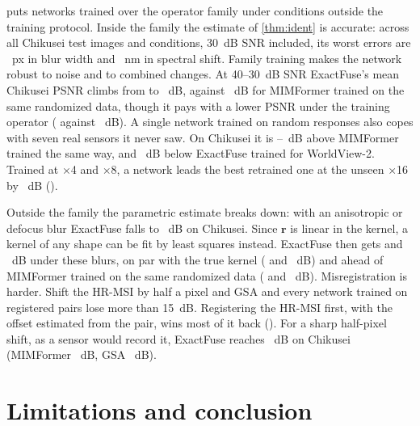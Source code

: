 \documentclass[10pt,twocolumn,letterpaper]{article}
\begin{document}
 puts networks trained over the operator family under conditions outside the training protocol. Inside the family the estimate of \cref{thm:ident} is accurate: across all Chikusei test images and conditions, 30~dB SNR included, its worst errors are ~px in blur width and ~nm in spectral shift. Family training makes the network robust to noise and to combined changes. At 40--30~dB SNR ExactFuse's mean Chikusei PSNR climbs from  to ~dB, against ~dB for MIMFormer trained on the same randomized data, though it pays with a lower PSNR under the training operator ( against ~dB). A single network trained on random responses also copes with seven real sensors it never saw. On Chikusei it is --~dB above MIMFormer trained the same way, and ~dB below ExactFuse trained for WorldView-2. Trained at $\times$4 and $\times$8, a network leads the best retrained one at the unseen $\times$16 by ~dB (\supp).

Outside the family the parametric estimate breaks down: with an anisotropic or defocus blur ExactFuse falls to ~dB on Chikusei. Since $\mathbf{r}$ is linear in the kernel, a kernel of any shape can be fit by least squares instead. ExactFuse then gets  and ~dB under these blurs, on par with the true kernel ( and ~dB) and ahead of MIMFormer trained on the same randomized data ( and ~dB). Misregistration is harder. Shift the HR-MSI by half a pixel and GSA and every network trained on registered pairs lose more than 15~dB. Registering the HR-MSI first, with the offset estimated from the pair, wins most of it back (\supp). For a sharp half-pixel shift, as a sensor would record it, ExactFuse reaches ~dB on Chikusei (MIMFormer ~dB, GSA ~dB).

\section{Limitations and conclusion}
\label{sec:conclusion}
\end{document}
